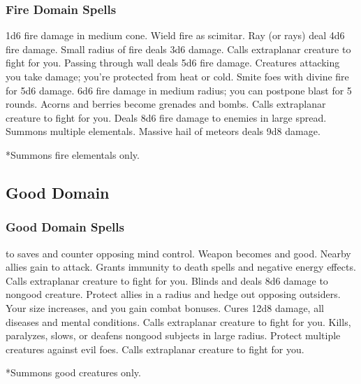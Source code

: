 \subsubsection{Fire Domain Spells}
\begin{spelllist}
   1d6 fire damage in medium cone.
  \spellhead[1]{}
   Wield fire as scimitar.
   Ray (or rays) deal 4d6 fire damage.
  \spellhead[3]{}
   Small radius of fire deals 3d6 damage.
   Calls extraplanar creature to fight for you.
   Passing through wall deals 5d6 fire damage.
   Creatures attacking you take damage; you're protected from heat or cold.
   Smite foes with divine fire for 5d6 damage.
   6d6 fire damage in medium radius; you can postpone blast for 5 rounds.
   Acorns and berries become grenades and bombs.
  \spellhead[7]{}
   Calls extraplanar creature to fight for you.
   Deals 8d6 fire damage to enemies in large spread.
   Summons multiple elementals.
   Massive hail of meteors deals 9d8 damage.
\end{spelllist}
*Summons fire elementals only.

\subsection{Good Domain}
\subsubsection{Good Domain Spells}
\begin{spelllist}
  \spellhead[1]{}
    to saves and counter opposing mind control.
   Weapon becomes  and good.
   Nearby allies gain  to attack.
   Grants immunity to death spells and negative energy effects.
   Calls extraplanar creature to fight for you.
  \spellhead[4]{}
   Blinds and deals 8d6 damage to nongood creature.
   Protect allies in a \areamed radius and hedge out opposing outsiders.
   Your size increases, and you gain combat bonuses.
   Cures 12d8 damage, all diseases and mental conditions.
   Calls extraplanar creature to fight for you.
  \F Kills, paralyzes, slows, or deafens nongood subjects in large radius.
  \spellhead[7]{}
  \spellhead[8]{}
   Protect multiple creatures against evil foes. 
  \spellhead[9]{}
   Calls extraplanar creature to fight for you.
\end{spelllist}
*Summons good creatures only.

